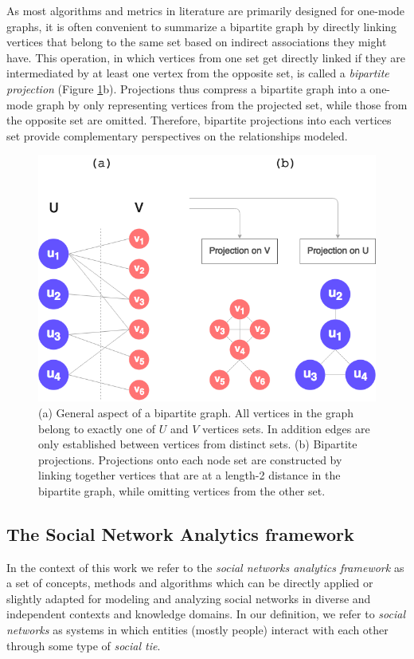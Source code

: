 As most algorithms and metrics in literature are primarily designed for one-mode graphs, it is often convenient to summarize a bipartite graph by directly linking vertices that belong to the same set based on indirect associations they might have. 
This operation, in which vertices from one set get directly linked if they are intermediated by at least one vertex from the opposite set, is called a \textit{bipartite projection} (Figure \ref{fig:bipartite_general}b).
Projections thus compress a bipartite graph into a one-mode graph by only representing vertices from the projected set, while those from the opposite set are omitted.
Therefore, bipartite projections into each vertices set provide complementary perspectives on the relationships modeled.
%
  \begin{figure}[h!]
  	\centering
    \includegraphics[width=0.5\linewidth]{figures/bipartite_general.png}
    \caption{(a) General aspect of a bipartite graph. All vertices in the graph belong to exactly one of $U$ and $V$ vertices sets. In addition edges are only established between vertices from distinct sets. (b) Bipartite projections. Projections onto each node set are constructed by linking together vertices that are at a length-2 distance in the bipartite graph, while omitting vertices from the other set.}
    \label{fig:bipartite_general}
  \end{figure}




\subsection{The Social Network Analytics framework}
In the context of this work we refer to the \textit{social networks analytics framework} as a set of concepts, methods and algorithms which can be directly applied or slightly adapted for modeling and analyzing social networks in diverse and independent contexts and knowledge domains.
%
In our definition, we refer to \textit{social networks} as systems in which entities (mostly people) interact with each other through some type of \textit{social tie}.

